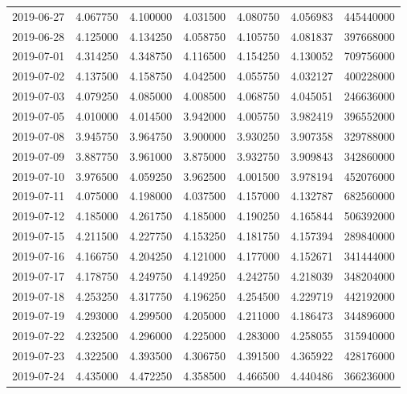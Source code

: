 \begin{tabular}{lrrrrrr}
2019-06-27 &    4.067750 &    4.100000 &    4.031500 &    4.080750 &    4.056983 &   445440000 \\
2019-06-28 &    4.125000 &    4.134250 &    4.058750 &    4.105750 &    4.081837 &   397668000 \\
2019-07-01 &    4.314250 &    4.348750 &    4.116500 &    4.154250 &    4.130052 &   709756000 \\
2019-07-02 &    4.137500 &    4.158750 &    4.042500 &    4.055750 &    4.032127 &   400228000 \\
2019-07-03 &    4.079250 &    4.085000 &    4.008500 &    4.068750 &    4.045051 &   246636000 \\
2019-07-05 &    4.010000 &    4.014500 &    3.942000 &    4.005750 &    3.982419 &   396552000 \\
2019-07-08 &    3.945750 &    3.964750 &    3.900000 &    3.930250 &    3.907358 &   329788000 \\
2019-07-09 &    3.887750 &    3.961000 &    3.875000 &    3.932750 &    3.909843 &   342860000 \\
2019-07-10 &    3.976500 &    4.059250 &    3.962500 &    4.001500 &    3.978194 &   452076000 \\
2019-07-11 &    4.075000 &    4.198000 &    4.037500 &    4.157000 &    4.132787 &   682560000 \\
2019-07-12 &    4.185000 &    4.261750 &    4.185000 &    4.190250 &    4.165844 &   506392000 \\
2019-07-15 &    4.211500 &    4.227750 &    4.153250 &    4.181750 &    4.157394 &   289840000 \\
2019-07-16 &    4.166750 &    4.204250 &    4.121000 &    4.177000 &    4.152671 &   341444000 \\
2019-07-17 &    4.178750 &    4.249750 &    4.149250 &    4.242750 &    4.218039 &   348204000 \\
2019-07-18 &    4.253250 &    4.317750 &    4.196250 &    4.254500 &    4.229719 &   442192000 \\
2019-07-19 &    4.293000 &    4.299500 &    4.205000 &    4.211000 &    4.186473 &   344896000 \\
2019-07-22 &    4.232500 &    4.296000 &    4.225000 &    4.283000 &    4.258055 &   315940000 \\
2019-07-23 &    4.322500 &    4.393500 &    4.306750 &    4.391500 &    4.365922 &   428176000 \\
2019-07-24 &    4.435000 &    4.472250 &    4.358500 &    4.466500 &    4.440486 &   366236000 \\

\end{tabular}
